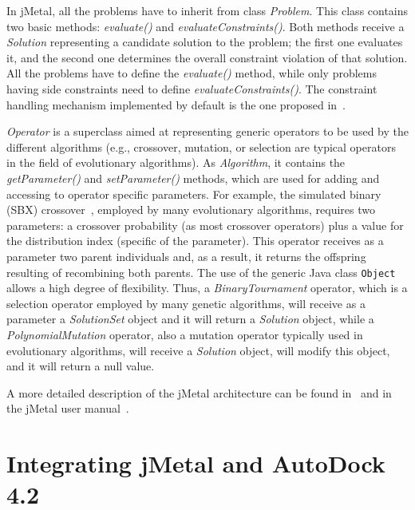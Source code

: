 In jMetal, all the problems have to inherit from class {\it Problem}. This class contains two basic methods: {\it evaluate()} and {\it evaluateConstraints()}. Both methods receive a {\it Solution} representing a candidate solution to the problem; the first one evaluates it, and the second one determines the overall constraint violation of that solution. All the problems have to define the {\it evaluate()} method, while only problems having side constraints need to define {\it evaluateConstraints()}. The constraint handling mechanism implemented by default is the one proposed in~\cite{deb02fast}.

{\it Operator} is a superclass aimed at representing generic operators to be used by the different algorithms (e.g., crossover, mutation, or selection are typical operators in the field of evolutionary algorithms). As {\it Algorithm}, it contains the {\it getParameter()} and {\it setParameter()} methods, which are used for adding and accessing to operator specific parameters. For example, the simulated binary (SBX) crossover~\cite{deb01multiobjective}, employed by many evolutionary algorithms, requires two parameters: a crossover probability (as most crossover operators) plus a value for the distribution index (specific of the parameter). This operator receives as a parameter two parent individuals and, as a result, it returns the offspring resulting of recombining both parents. The use of the generic Java class {\tt Object} allows a high degree of flexibility. Thus, a {\it BinaryTournament} operator, which is a selection operator employed by many genetic algorithms, will receive as a parameter a {\it SolutionSet} object and it will return a {\it Solution} object, while a {\it PolynomialMutation} operator, also a mutation operator typically used in evolutionary algorithms, will receive a {\it Solution} object, will modify this object, and it will return a null value.

A more detailed description of the jMetal architecture can be found in~\cite{DN10jmetal} and in the jMetal user manual~\cite{ND10}.

\section{Integrating jMetal and AutoDock 4.2}
\label{sec:jMetal_Autodock}

